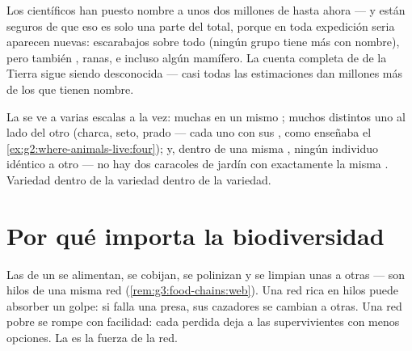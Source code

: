 \begin{example}\label{ex:g5:biodiversity:planet}
Los científicos han puesto nombre a unos dos millones de 
hasta ahora --- y están seguros de que eso es solo una parte del
total, porque en toda expedición seria aparecen  nuevas:
escarabajos sobre todo (ningún grupo tiene más  con nombre),
pero también , ranas,  e incluso algún mamífero. La cuenta
completa de  de la Tierra sigue siendo desconocida --- casi
todas las estimaciones dan millones más de los que tienen nombre.
\end{example}

\begin{remark}\label{rem:g5:biodiversity:scales}
La  se ve a varias escalas a la vez: muchas  en
un mismo ; muchos  distintos uno al lado del otro
(charca, seto, prado --- cada uno con sus , como enseñaba el
\cref{ex:g2:where-animals-live:four}); y, dentro de una misma ,
ningún individuo idéntico a otro --- no hay dos caracoles de jardín
con exactamente la misma . Variedad dentro de la variedad dentro
de la variedad.
\end{remark}

\section{Por qué importa la biodiversidad}

\begin{proposition}\label{prop:g5:biodiversity:web}
Las  de un  se alimentan, se cobijan, se polinizan y se
limpian unas a otras --- son hilos de una misma red
(\cref{rem:g3:food-chains:web}). Una red rica en hilos puede absorber
un golpe: si falla una  presa, sus cazadores se cambian a
otras. Una red pobre se rompe con facilidad: cada  perdida deja
a las supervivientes con menos opciones. La  es la fuerza
de la red.
\end{proposition}
\admitted

